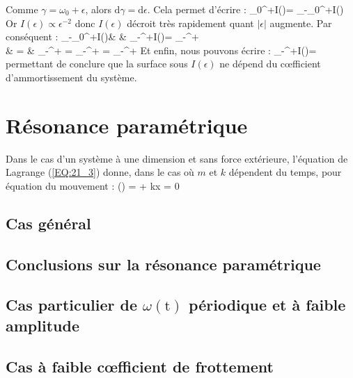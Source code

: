 Comme $\gamma = \omega_{0} + \epsilon$, alors $\mathrm{d}\gamma = \mathrm{d}\epsilon$. Cela permet d'\'{e}crire :
\benn
	\int_{0}^{+\infty}I(\gamma)\gamma = \int_{-\omega_{0}}^{+\infty}I(\epsilon)\epsilon
\eenn
Or $I(\epsilon) \propto \epsilon^{-2}$ donc $I(\epsilon)$ d\'{e}croit tr\`{e}s rapidement quant $\lvert\epsilon\rvert$ augmente. Par cons\'{e}quent :
\bea
	\int_{-\omega_{0}}^{+\infty}I(\epsilon)\epsilon & \approx & \int_{-\infty}^{+\infty}I(\epsilon)\epsilon = \int_{-\infty}^{+\infty} \nonumber \\
	& = & \int_{-\infty}^{+\infty} = \int_{-\infty}^{+\infty} = \left[\arctan\right]_{-\infty}^{+\infty} \nonumber
\eea
Et enfin, nous pouvons \'{e}crire :
\be
	\int_{-\infty}^{+\infty}I(\epsilon)\epsilon =  \label{EQ:26_10}
\ee
permettant de conclure que la surface sous $I(\epsilon)$ ne d\'{e}pend du c{\oe}fficient d'ammortissement du syst\`{e}me.

\section{R\'{e}sonance param\'{e}trique}

Dans le cas d'un syst\`{e}me \`{a} une dimension et sans force ext\'{e}rieure, l'\'{e}quation de Lagrange (\ref{EQ:21_3}) donne, dans le cas o\`{u} $m$ et $k$ d\'{e}pendent du temps, pour \'{e}quation du mouvement :
\be
	\left(\right) =  \Leftrightarrow {} + kx = 0 \label{EQ:27_1}
\ee

\subsection{Cas g\'{e}n\'{e}ral}

\subsection{Conclusions sur la r\'{e}sonance param\'{e}trique}

\subsection{Cas particulier de $\omega(\mathrm{t})$ p\'{e}riodique et \`{a} faible amplitude}

\subsection{Cas \`{a} faible c{\oe}fficient de frottement}